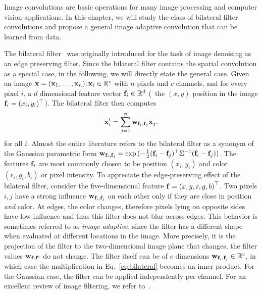 Image convolutions are basic operations for many image processing and computer vision applications. In this
chapter, we will study the class of bilateral filter convolutions and
propose a general image adaptive convolution that can be learned from data.

The bilateral filter~\cite{aurich1995non, smith97ijcv, tomasi1998bilateral} was originally introduced for the task of image denoising as an edge preserving filter. Since the bilateral filter contains the spatial
convolution as a special case, in the following, we will directly state the general case. Given an image $\mathbf{x}=(\mathbf{x}_1,\ldots,\mathbf{x}_n), \mathbf{x}_i\in\mathbb{R}^c$
with $n$ pixels and $c$ channels,
and for every pixel $i$, a $d$ dimensional feature vector $\mathbf{f}_i\in\mathbb{R}^d$ (\eg\ the $(x,y)$ position in the image $\mathbf{f}_i=(x_i,y_i)^{\top}$).
The bilateral filter then computes
\begin{equation}
  \mathbf{x}'_i = \sum_{j=1}^n \mathbf{w}_{\mathbf{f}_i,\mathbf{f}_j} \mathbf{x}_j.\label{eq:bilateral}
\end{equation}
for all $i$. Almost the entire literature refers to the bilateral filter as a synonym of the Gaussian parametric form
$\mathbf{w}_{\mathbf{f}_i,\mathbf{f}_j} = \exp{(-\frac{1}{2}(\mathbf{f}_i-\mathbf{f}_j)^{\top}\Sigma^{-1}(\mathbf{f}_i-\mathbf{f}_j))}$. The features $\mathbf{f}_i$ are most commonly chosen to be
position $(x_i,y_i)$ and color $(r_i,g_i,b_i)$ or pixel intensity. To appreciate the edge-preserving effect of
the bilateral filter, consider the five-dimensional feature $\mathbf{f}={(x,y,r,g,b)}^{\top}$.
Two pixels $i,j$ have a strong influence $\mathbf{w}_{\mathbf{f}_i,\mathbf{f}_j}$ on each other only if they are close in
position \emph{and} color. At edges, the color changes, therefore pixels lying on opposite sides have low
influence and thus this filter does not blur across edges. This behavior is
sometimes referred to as \emph{image adaptive}, since the filter has a different shape when evaluated at
different locations in the image. More precisely, it is the projection of the filter to the two-dimensional
image plane that changes, the filter values $\mathbf{w}_{\mathbf{f},\mathbf{f}'}$ do not change. The filter itself can
be of $c$ dimensions $\mathbf{w}_{\mathbf{f}_i,\mathbf{f}_j}\in\mathbb{R}^c$,
in which case the multiplication in Eq.~\ref{eq:bilateral} becomes an inner product. For the Gaussian case,
the filter can be applied independently per channel. For an excellent review of image filtering, we refer
to~\cite{milanfar2011tour}.

